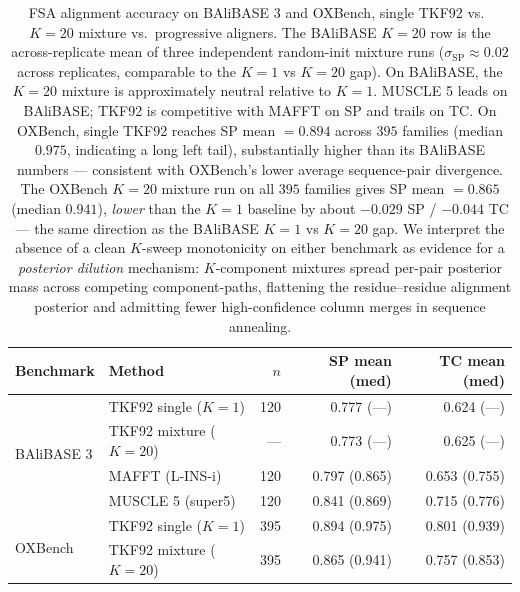 \begin{table}[ht]
\centering\small
\begin{tabular}{llrrr}
\toprule
Benchmark & Method & $n$ & SP mean (med) & TC mean (med) \\
\midrule
\multirow{4}{*}{BAliBASE 3}
& TKF92 single ($K = 1$)         & 120 & 0.777 (---)  & 0.624 (---) \\
& TKF92 mixture ($K = 20$)       & --- & 0.773 (---)  & 0.625 (---) \\
& MAFFT (L-INS-i)                & 120 & 0.797 (0.865)& 0.653 (0.755) \\
& MUSCLE 5 (super5)              & 120 & 0.841 (0.869)& 0.715 (0.776) \\
\midrule
\multirow{2}{*}{OXBench}
& TKF92 single ($K = 1$)         & 395 & 0.894 (0.975)& 0.801 (0.939) \\
& TKF92 mixture ($K = 20$)       & 395 & 0.865 (0.941)& 0.757 (0.853) \\
\bottomrule
\end{tabular}
\caption{FSA alignment accuracy on BAliBASE 3 and OXBench, single
TKF92 vs.\ $K = 20$ mixture vs.\ progressive aligners.  The
BAliBASE $K = 20$ row is the across-replicate mean of three
independent random-init mixture runs ($\sigma_{\text{SP}}
\!\approx\!0.02$ across replicates, comparable to the $K = 1$ vs
$K = 20$ gap).  On BAliBASE, the $K = 20$ mixture is approximately
neutral relative to $K = 1$.  MUSCLE 5 leads on BAliBASE; TKF92
is competitive with MAFFT on SP and trails on TC.  On OXBench,
single TKF92 reaches SP mean $= 0.894$ across $395$ families
(median $0.975$, indicating a long left tail), substantially
higher than its BAliBASE numbers --- consistent with OXBench's
lower average sequence-pair divergence.  The OXBench $K = 20$
mixture run on all $395$ families gives SP mean $= 0.865$
(median $0.941$), \emph{lower} than the $K = 1$ baseline by
about $-0.029$ SP / $-0.044$ TC --- the same direction as the
BAliBASE $K = 1$ vs $K = 20$ gap.  We interpret the absence of a
clean $K$-sweep monotonicity on either benchmark as evidence for
a \emph{posterior dilution} mechanism: $K$-component mixtures spread per-pair posterior mass
across competing component-paths, flattening the residue--residue
alignment posterior and admitting fewer high-confidence column
merges in sequence annealing.}
\label{tab:fsa-balibase-K-sweep}
\end{table}

